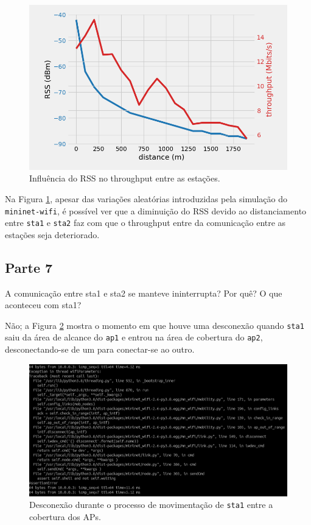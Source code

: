 \documentclass{article}
\begin{document}
\begin{figure}[!htb]
\centering
\includegraphics[width=\columnwidth]{images/p6_plot.png}
\caption{Influência do RSS no throughput entre as estações.}
\label{fig:p6_plot}
\end{figure}


Na Figura \ref{fig:p6_plot}, apesar das variações aleatórias
introduzidas pela simulação do \texttt{mininet-wifi},
é possível ver que a
diminuição do RSS devido ao distanciamento entre
\texttt{sta1} e \texttt{sta2} faz com que o throughput
entre da comunicação entre as estações seja deteriorado.

\subsection{Parte 7}

\begin{tcolorbox}
    A comunicação entre sta1 e sta2 se manteve ininterrupta? Por quê? O que aconteceu com sta1?
\end{tcolorbox}

Não; a Figura \ref{fig:p7_disconnection} mostra o momento
em que houve uma desconexão quando \texttt{sta1}
saiu da área de alcance do \texttt{ap1} e entrou na área
de cobertura do \texttt{ap2}, desconectando-se de um para
conectar-se ao outro.

\begin{figure}[!htb]
\centering
\includegraphics[width=\columnwidth]{images/p7_disconnection.png}
\caption{Desconexão durante o processo de movimentação de \texttt{sta1} entre a cobertura dos APs.}
\label{fig:p7_disconnection}
\end{figure}
\end{document}
